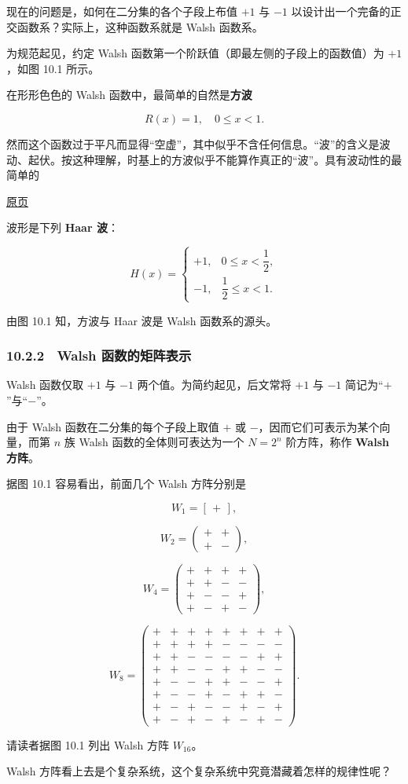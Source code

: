 \documentclass[
  10pt,
  fontset=fandol]{ctexart}
\begin{document}
现在的问题是，如何在二分集的各个子段上布值 \(+1\) 与 \(-1\) 以设计出一个完备的正交函数系？实际上，这种函数系就是 Walsh 函数系。

为规范起见，约定 Walsh 函数第一个阶跃值（即最左侧的子段上的函数值）为 \(+1\)，如图 10.1 所示。

在形形色色的 Walsh 函数中，最简单的自然是\textbf{方波}

\[
R(x)=1,\quad0\leqslant x<1.
\]

然而这个函数过于平凡而显得``空虚''，其中似乎不含任何信息。``波''的含义是波动、起伏。按这种理解，时基上的方波似乎不能算作真正的``波''。具有波动性的最简单的

\href{../../source-images/pdf-265.jpeg}{原页}

波形是下列 \textbf{Haar 波}：

\[
H(x)=\begin{cases}
+1,&0\leqslant x<\dfrac12,\\[4pt]
-1,&\dfrac12\leqslant x<1.
\end{cases}
\]

由图 10.1 知，方波与 Haar 波是 Walsh 函数系的源头。

\subsubsection{10.2.2　Walsh 函数的矩阵表示}\label{walsh-ux51fdux6570ux7684ux77e9ux9635ux8868ux793a}

Walsh 函数仅取 \(+1\) 与 \(-1\) 两个值。为简约起见，后文常将 \(+1\) 与 \(-1\) 简记为``\(+\)''与``\(-\)''。

由于 Walsh 函数在二分集的每个子段上取值 \(+\) 或 \(-\)，因而它们可表示为某个向量，而第 \(n\) 族 Walsh 函数的全体则可表达为一个 \(N=2^n\) 阶方阵，称作 \textbf{Walsh 方阵}。

据图 10.1 容易看出，前面几个 Walsh 方阵分别是

\[
W_1=[\,+\,],
\]

\[
W_2=\begin{pmatrix}+&+\\+&-\end{pmatrix},
\]

\[
W_4=\begin{pmatrix}
+&+&+&+\\
+&+&-&-\\
+&-&-&+\\
+&-&+&-
\end{pmatrix},
\]

\[
W_8=\begin{pmatrix}
+&+&+&+&+&+&+&+\\
+&+&+&+&-&-&-&-\\
+&+&-&-&-&-&+&+\\
+&+&-&-&+&+&-&-\\
+&-&-&+&+&-&-&+\\
+&-&-&+&-&+&+&-\\
+&-&+&-&-&+&-&+\\
+&-&+&-&+&-&+&-
\end{pmatrix}.
\]

请读者据图 10.1 列出 Walsh 方阵 \(W_{16}\)。

Walsh 方阵看上去是个复杂系统，这个复杂系统中究竟潜藏着怎样的规律性呢？
\end{document}
